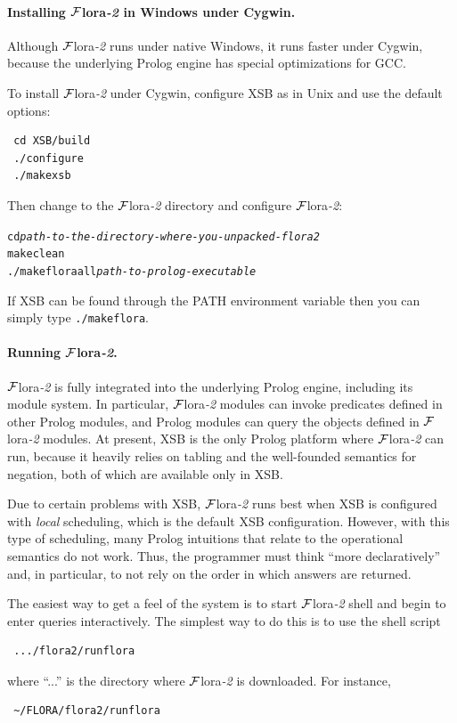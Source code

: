 \documentclass[11pt]{article}
\newcommand{\FLORA}{{\mbox{\sc ${\cal F}${lora}\rm\emph{-2}}}\xspace}
\begin{document}
\paragraph{Installing \FLORA in Windows under Cygwin.}

Although \FLORA runs under native Windows, it runs faster under Cygwin,
because the underlying Prolog engine has special optimizations for GCC.

To install \FLORA under Cygwin, configure XSB as in Unix and use the
default options:
\begin{verbatim}
 cd XSB/build
 ./configure
 ./makexsb
\end{verbatim}
Then change to the \FLORA directory and configure \FLORA:
\begin{alltt}
   cd \emph{path-to-the-directory-where-you-unpacked-flora2}
   make clean
   ./makeflora all \emph{path-to-prolog-executable}
\end{alltt}
If XSB can be found through the PATH environment variable then you can
simply type {\tt ./makeflora}.


\paragraph{Running \FLORA.}
\FLORA is fully integrated into the underlying Prolog engine, including its
module system. In particular, \FLORA modules can invoke predicates defined in
other Prolog modules, and Prolog modules can query the objects defined in
\FLORA modules. At present, XSB is the only Prolog platform where \FLORA
can run, because it heavily relies on tabling and the well-founded
semantics for negation, both of which are available only in XSB.

Due to certain problems with XSB, \FLORA runs best when XSB is configured
with \emph{local} scheduling, which is the default XSB configuration.
However, with this type of scheduling, many Prolog intuitions that relate
to the operational semantics do not work. Thus, the programmer must think
``more declaratively'' and, in particular, to not rely on the 
order in which answers are returned.


\label{runflora-page}
The easiest way to get a feel of the system
is to start \FLORA shell and begin to enter queries interactively.
The simplest way to do this is to use the shell script
\begin{verbatim}
 .../flora2/runflora  
\end{verbatim}
where ``...'' is the directory where \FLORA is downloaded. For instance,
\begin{verbatim}
 ~/FLORA/flora2/runflora  
\end{verbatim}
\end{document}
